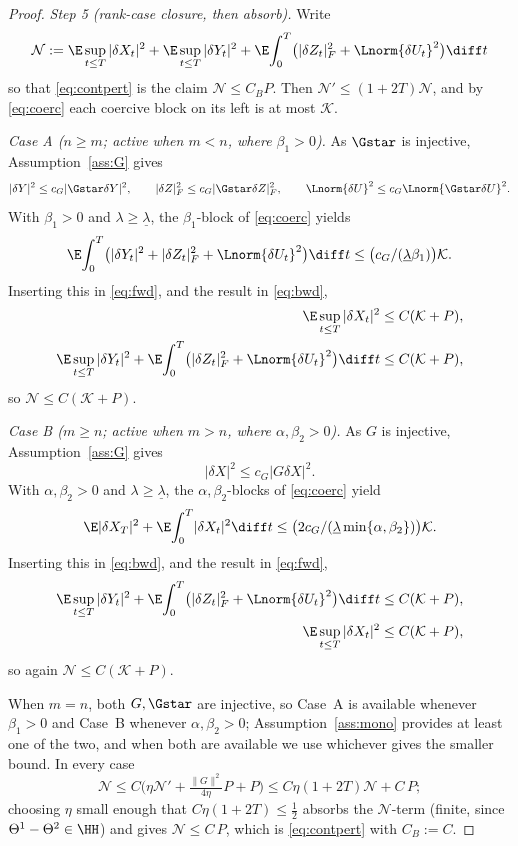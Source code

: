 \begin{proof}
\emph{Step 5 (rank-case closure, then absorb).} Write
\[
\mathcal N:=\E\sup_{t\le T}|\delta X_t|^2+\E\sup_{t\le T}|\delta Y_t|^2+\E\!\int_0^T\!\big(|\delta Z_t|_F^2+\Lnorm{\delta U_t}^2\big)\diff t
\]
so that \eqref{eq:contpert} is the claim $\mathcal N\le C_B P$. Then
$\mathcal N'\le(1+2T)\mathcal N$, and by
\eqref{eq:coerc} each coercive block on its left is at most $\mathcal K$.

\emph{Case A ($n\ge m$; active when $m<n$, where $\beta_1>0$).} As $\Gstar$ is injective,
Assumption~\ref{ass:G} gives
\[
|\delta Y|^2\le c_G|\Gstar\delta Y|^2,\qquad
|\delta Z|_F^2\le c_G|\Gstar\delta Z|_F^2,\qquad
\Lnorm{\delta U}^2\le c_G\Lnorm{\Gstar\delta U}^2 .
\]
With $\beta_1>0$ and $\lambda\ge\underline\lambda$, the $\beta_1$-block of \eqref{eq:coerc} yields
\[
\E\!\int_0^T\!\big(|\delta Y_t|^2+|\delta Z_t|_F^2+\Lnorm{\delta U_t}^2\big)\diff t\le\bigl(c_G/(\underline\lambda\beta_1)\bigr)\mathcal K.
\]
Inserting this in \eqref{eq:fwd}, and the result in \eqref{eq:bwd},
\[
\begin{aligned}
\E\sup_{t\le T}|\delta X_t|^2&\le C(\mathcal K+P),\\
\E\sup_{t\le T}|\delta Y_t|^2
+\E\!\int_0^T\!\big(|\delta Z_t|_F^2+\Lnorm{\delta U_t}^2\big)\diff t&\le C(\mathcal K+P),
\end{aligned}
\]
so $\mathcal N\le C(\mathcal K+P)$.

\emph{Case B ($m\ge n$; active when $m>n$, where $\alpha,\beta_2>0$).} As $G$ is injective,
Assumption~\ref{ass:G} gives
\[
|\delta X|^2\le c_G|G\delta X|^2 .
\]
With $\alpha,\beta_2>0$ and $\lambda\ge\underline\lambda$, the $\alpha,\beta_2$-blocks of
\eqref{eq:coerc} yield
\[
\E|\delta X_T|^2+\E\!\int_0^T\!|\delta X_t|^2\diff t\le\bigl(2c_G/(\underline\lambda\min\{\alpha,\beta_2\})\bigr)\mathcal K.
\]
Inserting this in \eqref{eq:bwd}, and the result in \eqref{eq:fwd},
\[
\begin{aligned}
\E\sup_{t\le T}|\delta Y_t|^2
+\E\!\int_0^T\!\big(|\delta Z_t|_F^2+\Lnorm{\delta U_t}^2\big)\diff t&\le C(\mathcal K+P),\\
\E\sup_{t\le T}|\delta X_t|^2&\le C(\mathcal K+P),
\end{aligned}
\]
so again $\mathcal N\le C(\mathcal K+P)$.

When $m=n$, both $G,\Gstar$ are injective, so Case~A is available whenever $\beta_1>0$ and
Case~B whenever $\alpha,\beta_2>0$; Assumption~\ref{ass:mono} provides at least one of the
two, and when both are available we use whichever gives the smaller bound. In every
case
\[
\mathcal N\le C\Big(\eta\mathcal N'+\tfrac{\|G\|^2}{4\eta} P+P\Big)\le C\eta(1+2T)\mathcal N+C\,P;
\]
choosing $\eta$
small enough that $C\eta(1+2T)\le\tfrac12$ absorbs the $\mathcal N$-term (finite,
since $\Theta^1-\Theta^2\in\HH$) and gives
$\mathcal N\le C\,P$, which is \eqref{eq:contpert} with $C_B:=C$.
\end{proof}

